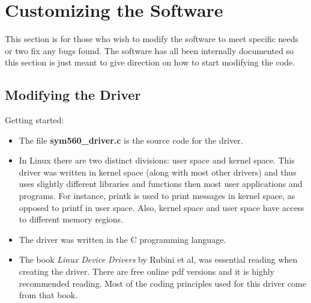 \documentclass[11pt]{article}
\begin{document}





    \section{Customizing the Software} \label{customizing}
    This section is for those who wish to modify the software to meet specific needs or two fix any bugs found. The software has all been internally documented so this section is just meant to give direction on how to start modifying the code.

    \subsection{Modifying the Driver} \label{moddriver}
    Getting started:
    \begin{itemize}
        \item The file \textbf{sym560\_driver.c} is the source code for the driver.
        \item In Linux there are two distinct divisions: user space and kernel space. This driver was written in kernel space (along with most other drivers) and thus uses slightly different libraries and functions then most user applications and programs. For instance, printk is used to print messages in kernel space, as opposed to printf in user space. Also, kernel space and user space have access to different memory regions.
        \item The driver was written in the C programming language.
        \item The book \textit{Linux Device Drivers} by Rubini et al, was essential reading when creating the driver. There are free online pdf versions and it is highly recommended reading. Most of the coding principles used for this driver come from that book.
    \end{itemize}
\end{document}
